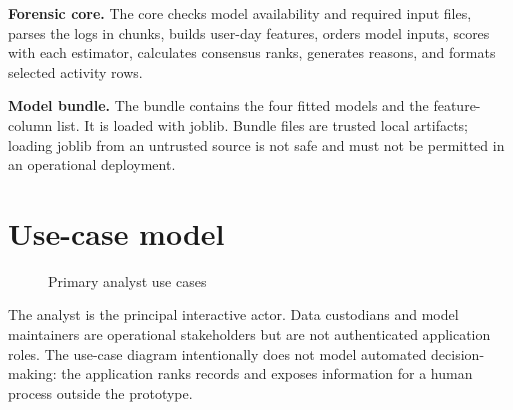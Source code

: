 \textbf{Forensic core.} The core checks model availability and required
input files, parses the logs in chunks, builds user-day features,
orders model inputs, scores with each estimator, calculates consensus
ranks, generates reasons, and formats selected activity rows.

\textbf{Model bundle.} The bundle contains the four fitted models and
the feature-column list. It is loaded with joblib. Bundle files are
trusted local artifacts; loading joblib from an untrusted source is
not safe and must not be permitted in an operational deployment.

\section{Use-case model}
\begin{figure}[H]
\centering
{}
\caption{Primary analyst use cases}
\label{fig:use-case}
\end{figure}

The analyst is the principal interactive actor. Data custodians and
model maintainers are operational stakeholders but are not
authenticated application roles. The use-case diagram intentionally
does not model automated decision-making: the application ranks
records and exposes information for a human process outside the
prototype.

